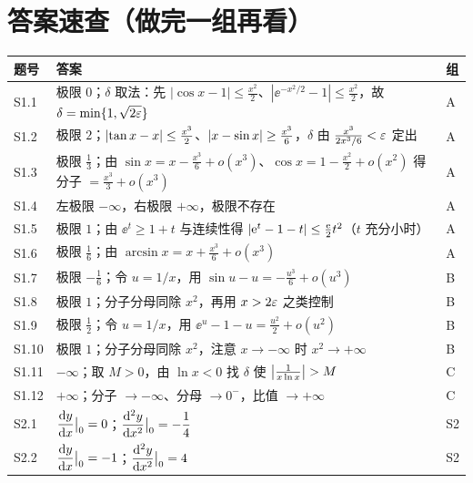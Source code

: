 
\section{答案速查（做完一组再看）}

\small\setlength{\tabcolsep}{4pt}
\begin{longtable}{@{}p{1.4cm}p{12.0cm}p{0.9cm}@{}}
\toprule
题号 & 答案 & 组\\
\midrule
\endhead
S1.1 & 极限 $0$；$\delta$ 取法：先 $|\cos x-1|\leq\frac{x^{2}}{2}$、$|\ee^{-x^{2}/2}-1|\leq\frac{x^{2}}{2}$，故 $\delta=\min\{1,\sqrt{2\varepsilon}\}$ & A\\
S1.2 & 极限 $2$；$\left\lvert \tan x-x\right\rvert\leq\frac{x^{3}}{2}$、$\left\lvert x-\sin x\right\rvert\geq\frac{x^{3}}{6}$，$\delta$ 由 $\frac{x^{3}}{2x^{3}/6}<\varepsilon$ 定出 & A\\
S1.3 & 极限 $\frac13$；由 $\sin x=x-\frac{x^{3}}{6}+o(x^{3})$、$\cos x=1-\frac{x^{2}}{2}+o(x^{2})$ 得分子 $=\frac{x^{3}}{3}+o(x^{3})$ & A\\
S1.4 & 左极限 $-\infty$，右极限 $+\infty$，极限不存在 & A\\
S1.5 & 极限 $1$；由 $\ee^{t}\geq1+t$ 与连续性得 $\left\lvert \mathrm{e}^{t}-1-t\right\rvert\leq\frac{\mathrm{e}}{2}t^{2}$（$t$ 充分小时） & A\\
S1.6 & 极限 $\frac16$；由 $\arcsin x=x+\frac{x^{3}}{6}+o(x^{3})$ & A\\
\midrule
S1.7 & 极限 $-\frac16$；令 $u=1/x$，用 $\sin u-u=-\frac{u^{3}}{6}+o(u^{3})$ & B\\
S1.8 & 极限 $1$；分子分母同除 $x^{2}$，再用 $x>2\varepsilon$ 之类控制 & B\\
S1.9 & 极限 $\frac12$；令 $u=1/x$，用 $\ee^{u}-1-u=\frac{u^{2}}{2}+o(u^{2})$ & B\\
S1.10 & 极限 $1$；分子分母同除 $x^{2}$，注意 $x\to-\infty$ 时 $x^{2}\to+\infty$ & B\\
\midrule
S1.11 & $-\infty$；取 $M>0$，由 $\ln x<0$ 找 $\delta$ 使 $\left\lvert \frac{1}{x\ln x}\right\rvert>M$ & C\\
S1.12 & $+\infty$；分子 $\to-\infty$、分母 $\to0^{-}$，比值 $\to+\infty$ & C\\
\midrule
S2.1 & $\dfrac{\mathrm{d} y}{\mathrm{d} x}\big|_{0}=0$；$\dfrac{\mathrm{d}^{2}y}{\mathrm{d} x^{2}}\big|_{0}=-\dfrac{1}{4}$ & S2\\
S2.2 & $\dfrac{\mathrm{d} y}{\mathrm{d} x}\big|_{0}=-1$；$\dfrac{\mathrm{d}^{2}y}{\mathrm{d} x^{2}}\big|_{0}=4$ & S2\\

\end{longtable}
